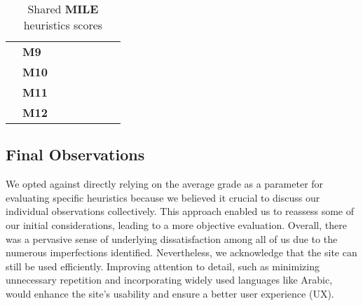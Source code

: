 \begin{table}[htp!]
\begin{tabular}{ |c|l|c|c|c|c|c|c| }
        \cline{2-8}
        & \textbf{M9} & \textbf{\color{unicefGreen}{4}} & \textbf{\color{unicefGreen}{4}} & \textbf{\color{unicefGreen}{4.5}} & \textbf{\color{unicefGreen}{5}} & \textbf{\color{unicefGreen}{4.375}} & \textbf{\color{unicefGreen}{4.5}}\\
        \cline{2-8}
        & \textbf{M10} & \textbf{\color{unicefGreen}{4}} & \textbf{\color{unicefOrange}{3}} & \textbf{\color{unicefGreen}{4.5}} & \textbf{\color{unicefGreen}{4}} & \textbf{\color{unicefOrange}{3.875}} & \textbf{\color{unicefGreen}{4}}\\
        \cline{2-8}
        & \textbf{M11} & \textbf{\color{unicefGreen}{4}} & \textbf{\color{unicefGreen}{4}} & \textbf{\color{unicefGreen}{4}} & \textbf{\color{unicefGreen}{4}} & \textbf{\color{unicefGreen}{4}} & \textbf{\color{unicefGreen}{4}}\\
        \cline{2-8}
        & \textbf{M12} & \textbf{\color{unicefGreen}{5}} & \textbf{\color{unicefGreen}{5}} & \textbf{\color{unicefGreen}{5}} & \textbf{\color{unicefGreen}{5}} & \textbf{\color{unicefGreen}{5}} & \textbf{\color{unicefGreen}{5}}\\
        \hline
    \end{tabular}
    \caption{Shared \textbf{MILE} heuristics scores}
\end{table}
\newpage
\subsection{Final Observations}
We opted against directly relying on the average grade as a parameter for evaluating specific heuristics because we believed it crucial to discuss our individual observations collectively. 
This approach enabled us to reassess some of our initial considerations, leading to a more objective evaluation. 
Overall, there was a pervasive sense of underlying dissatisfaction among all of us due to the numerous imperfections identified. 
Nevertheless, we acknowledge that the site can still be used efficiently. 
Improving attention to detail, such as minimizing unnecessary repetition and incorporating widely used languages like Arabic, would enhance the site's usability and ensure a better user experience (UX).